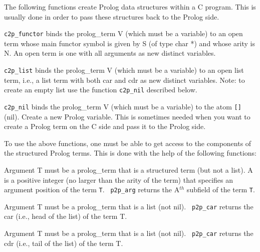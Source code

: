 The following functions create Prolog data structures within a C
program. This is usually done in order to pass these structures back to
the Prolog side.
\begin{description}
 
    {\tt c2p\_functor} binds the prolog\_term V (which must be a
    variable) to an open term whose main functor symbol is given by S
    (of type char *) and whose arity is N.  An open term is one with
    all arguments as new distinct variables.

 
    {\tt c2p\_list} binds the prolog\_term V (which must be a variable)
    to an open list term, i.e., a list term with both car and cdr as
    new distinct variables. Note: to create an empty list use the function
    {\tt c2p\_nil} described below.

 
    {\tt c2p\_nil} binds the prolog\_term V (which must be a
    variable) to the atom \verb|[]| (nil).
 
    Create a new Prolog variable. This is sometimes needed when you want to
    create a Prolog term on the C side and pass it to the Prolog side.
\end{description}



To use the above functions, one must be able to get access to the
components of the structured Prolog terms.
This is done with the help of the following functions:

\begin{description}
 
    Argument T must be a prolog\_term that is a structured term (but
    not a list).  A is a positive integer (no larger than the arity of
    the term) that specifies an argument position of the term {\tt T}.  {\tt
    p2p\_arg} returns the A$^{th}$ subfield of the term {\tt T}.

 
    Argument T must be a prolog\_term that is a list (not nil).  {\tt
    p2p\_car} returns the car (i.e., head of the list) of the
    term T.

 
    Argument T must be a prolog\_term that is a list (not nil).  {\tt
    p2p\_car} returns the cdr (i.e., tail of the list) of the
    term T.
\end{description}

